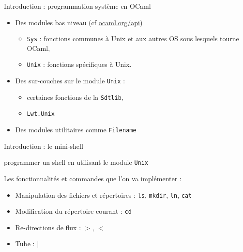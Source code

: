 
\begin{frame}{Introduction : programmation système en OCaml}

    \begin{itemize}[label=\small{}]
        \item Des modules bas niveau (cf \url{ocaml.org/api})
            \begin{itemize}[label=\small{}]
                \item \texttt{Sys} : fonctions communes à Unix et aux autres OS sous lesquels tourne OCaml,
                \item \texttt{Unix} : fonctions spécifiques à Unix.
            \end{itemize}
        \item Des sur-couches sur le module \texttt{Unix} :
            \begin{itemize}[label=\small{}]
                \item certaines fonctions de la \texttt{Sdtlib}, 
                \item \texttt{Lwt.Unix}
            \end{itemize}
        \item Des modules utilitaires comme \texttt{Filename}
    \end{itemize}

\end{frame}


\begin{frame}{Introduction : le mini-shell}

     programmer un shell en utilisant le module \texttt{Unix} 
    
    Les fonctionnalités et commandes que l'on va implémenter :
    \begin{itemize}[label=\small{}]
        \item<1-> Manipulation des fichiers et répertoires : \texttt{ls}, \texttt{mkdir}, \texttt{ln}, \texttt{cat}
        \item<1-> Modification du répertoire courant : \texttt{cd}
        \item<1-> Re-directions de flux :  $>$, $<$
        \item<1-> Tube : $|$

    \end{itemize}
\end{frame}
